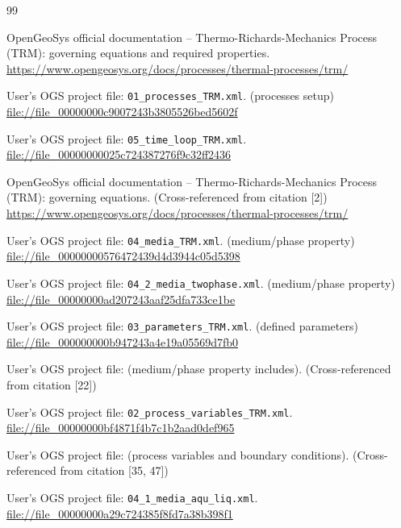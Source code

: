\documentclass[10pt,a4paper]{article}
\begin{document}
\begin{thebibliography}{99}

OpenGeoSys official documentation – Thermo-Richards-Mechanics Process (TRM): governing equations and required properties.
\href{https://www.opengeosys.org/docs/processes/thermal-processes/trm/}{https://www.opengeosys.org/docs/processes/thermal-processes/trm/}

User's OGS project file: \texttt{01\_processes\_TRM.xml}. (processes setup)
\href{file://file_00000000c9007243b3805526bed5602f}{file://file\_00000000c9007243b3805526bed5602f}

User's OGS project file: \texttt{05\_time\_loop\_TRM.xml}.
\href{file://file_00000000025c724387276f9c32ff2436}{file://file\_00000000025c724387276f9c32ff2436}

OpenGeoSys official documentation – Thermo-Richards-Mechanics Process (TRM): governing equations. (Cross-referenced from citation [2])
\href{https://www.opengeosys.org/docs/processes/thermal-processes/trm/}{https://www.opengeosys.org/docs/processes/thermal-processes/trm/}

User's OGS project file: \texttt{04\_media\_TRM.xml}. (medium/phase property)
\href{file://file_00000000576472439d4d3944c05d5398}{file://file\_00000000576472439d4d3944c05d5398}

User's OGS project file: \texttt{04\_2\_media\_twophase.xml}. (medium/phase property)
\href{file://file_00000000ad207243aaf25dfa733ce1be}{file://file\_00000000ad207243aaf25dfa733ce1be}

User's OGS project file: \texttt{03\_parameters\_TRM.xml}. (defined parameters)
\href{file://file_000000000b947243a4e19a05569d7fb0}{file://file\_000000000b947243a4e19a05569d7fb0}

User's OGS project file: (medium/phase property includes). (Cross-referenced from citation [22])

User's OGS project file: \texttt{02\_process\_variables\_TRM.xml}.
\href{file://file_00000000bf4871f4b7c1b2aad0def965}{file://file\_00000000bf4871f4b7c1b2aad0def965}

User's OGS project file: (process variables and boundary conditions). (Cross-referenced from citation [35, 47])

User's OGS project file: \texttt{04\_1\_media\_aqu\_liq.xml}.
\href{file://file_00000000a29c724385f8fd7a38b398f1}{file://file\_00000000a29c724385f8fd7a38b398f1}

\end{thebibliography}
\end{document}
